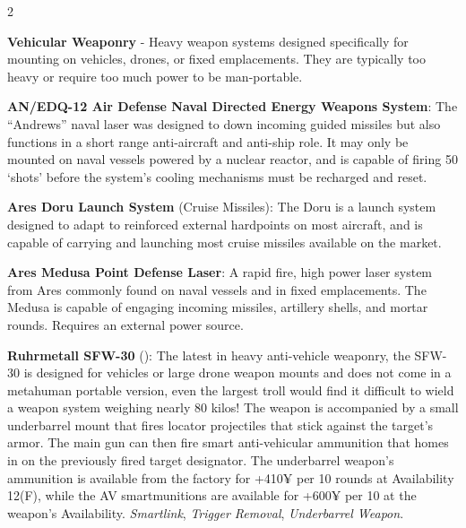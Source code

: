 \documentclass[
  oneside]{article}
\begin{document}
\begin{multicols}{2}

\textbf{Vehicular Weaponry} - Heavy weapon systems
designed specifically for mounting on vehicles,
drones, or fixed emplacements. They are typically
too heavy or require too much power to be
man-portable.

\textbf{AN/EDQ-12 Air Defense Naval Directed
Energy Weapons System}: The ``Andrews'' naval
laser was designed to down incoming guided
missiles but also functions in a short range
anti-aircraft and anti-ship role. It may only be
mounted on naval vessels powered by a nuclear
reactor, and is capable of firing 50 `shots'
before the system's cooling mechanisms must be
recharged and reset.

\textbf{Ares Doru Launch System} (Cruise
Missiles): The Doru is a launch system designed to
adapt to reinforced external hardpoints on most
aircraft, and is capable of carrying and launching
most cruise missiles available on the market.

\textbf{Ares Medusa Point Defense Laser}: A rapid
fire, high power laser system from Ares commonly
found on naval vessels and in fixed emplacements.
The Medusa is capable of engaging incoming
missiles, artillery shells, and mortar rounds.
Requires an external power source.

\textbf{Ruhrmetall SFW-30} (): The latest in heavy
anti-vehicle weaponry, the SFW-30 is designed for
vehicles or large drone weapon mounts and does not
come in a metahuman portable version, even the
largest troll would find it difficult to wield a
weapon system weighing nearly 80 kilos! The weapon
is accompanied by a small underbarrel mount that
fires locator projectiles that stick against the
target's armor. The main gun can then fire smart
anti-vehicular ammunition that homes in on the
previously fired target designator. The
underbarrel weapon's ammunition is available from
the factory for +410¥ per 10 rounds at
Availability 12(F), while the AV smartmunitions
are available for +600¥ per 10 at the weapon's
Availability. \emph{Smartlink}, \emph{Trigger
Removal}, \emph{Underbarrel Weapon}.

\end{multicols}
\end{document}
